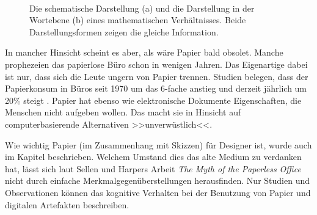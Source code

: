 \begin{figure}
        \myfloatalign
         \quad
         \\
        \caption[Darstellungsformen \newline \citep{Johnson:2009}]{Die schematische Darstellung (a) und die Darstellung in der Wortebene (b) eines mathematischen Verhältnisses. Beide Darstellungsformen zeigen die gleiche Information. }\label{fig:johnsonDarstellungsformen}
\end{figure}

\medskip In mancher Hinsicht scheint es aber, als wäre Papier bald obsolet. Manche prophezeien das papierlose Büro schon in wenigen Jahren. Das Eigenartige dabei ist nur, dass sich die Leute ungern von Papier trennen. Studien belegen, dass der Papierkonsum in Büros seit 1970 um das 6-fache anstieg und derzeit jährlich um 20\% steigt \citep{seybold:1992}. Papier hat ebenso wie elektronische Dokumente Eigenschaften, die Menschen nicht aufgeben wollen. Das macht sie in Hinsicht auf computerbasierende Alternativen >>unverwüstlich<<. \citep{Luff:1992} 

\medskip Wie wichtig Papier (im Zusammenhang mit Skizzen) für Designer ist, wurde auch im Kapitel  beschrieben. Welchem Umstand dies das alte Medium zu verdanken hat, lässt sich laut Sellen und Harpers Arbeit \emph{The Myth of the Paperless Office} \citep{Sellen:2003} nicht durch einfache Merkmalgegenüberstellungen herausfinden. Nur Studien und Observationen können das kognitive Verhalten bei der Benutzung von Papier und digitalen Artefakten beschreiben. 

